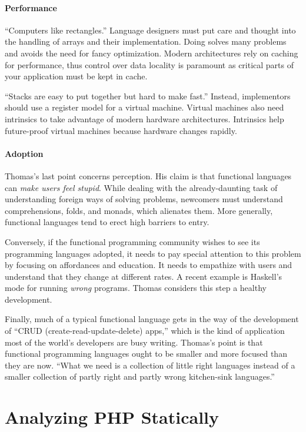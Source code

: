 \documentclass{jfp1}
\begin{document}
\paragraph{Performance} ``Computers like rectangles.''  Language designers
must put care and thought into the handling of arrays and their
implementation. Doing solves many problems and avoids the need for fancy
optimization. Modern architectures rely on caching for performance, thus
control over data locality is paramount as critical parts of your
application must be kept in cache. 

``Stacks are easy to put together but hard to make fast.''  Instead,
implementors should use a register model for a virtual machine. Virtual
machines also need intrinsics to take advantage of modern hardware
architectures.  Intrinsics help future-proof virtual machines because
hardware changes rapidly.

\paragraph{Adoption} Thomas's last point concerns perception. His claim is
that functional languages can \textit{make users feel stupid}. While
dealing with the already-daunting task of understanding foreign ways of
solving problems, newcomers must understand comprehensions, folds, and
monads, which alienates them.  More generally, functional
languages tend to erect high barriers to entry. 

Conversely, if the functional programming community wishes to see its
programming languages adopted, it needs to pay special attention to this
problem by focusing on affordances and education. It needs to empathize
with users and understand that they change at different rates. A recent
example is Haskell's mode for running \textit{wrong} programs. Thomas
considers this step a healthy development.

Finally, much of a typical functional language gets in the way of the
development of ``CRUD (create-read-update-delete) apps,'' which is the kind
of application most of the world's developers are busy writing. Thomas's
point is that functional programming languages ought to be smaller and more
focused than they are now. ``What we need is a collection of little right
languages instead of a smaller collection of partly right and partly wrong
kitchen-sink languages.''

\section{Analyzing PHP Statically}
\end{document}
